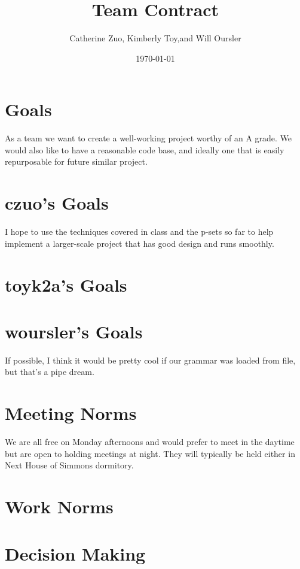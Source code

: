 


\author{ Catherine Zuo, Kimberly Toy,and Will Oursler} %
\address{ MIT, Cambridge, MA }
\title{Team Contract}
\date{\today}
\maketitle

\section{ Goals }
As a team we want to create a well-working project worthy of an A grade. We would also like to have a reasonable code base, and ideally one that is easily repurposable for future similar project.

\section{ czuo's Goals }
I hope to use the techniques covered in class and the p-sets so far to help implement a larger-scale project that has good design and runs smoothly.  
\section{ toyk2a's Goals }
\section{ woursler's Goals }
If possible, I think it would be pretty cool if our grammar was loaded from file, but that's a pipe dream.

\section{Meeting Norms}
We are all free on Monday afternoons and would prefer to meet in the daytime but are open to holding meetings at night.  They will typically be held either in Next House of Simmons dormitory.  

\section{Work Norms}

\section{Decision Making}



